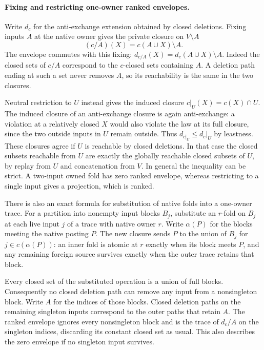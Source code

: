 \paragraph{Fixing and restricting one-owner ranked envelopes.}
Write $d_c$ for the anti-exchange extension obtained by
closed deletions. Fixing inputs $A$ at the native owner
gives the private closure on $V\setminus A$
\[
 (c/A)(X)=c(A\cup X)\setminus A .
\]
The envelope commutes with this fixing:
$d_{c/A}(X)=d_c(A\cup X)\setminus A$.
Indeed the closed sets of $c/A$ correspond to the
$c$-closed sets containing $A$. A deletion path ending
at such a set never removes $A$, so its reachability
is the same in the two closures.

Neutral restriction to $U$ instead gives the induced
closure $c|_U(X)=c(X)\cap U$. The induced closure of
an anti-exchange closure is again anti-exchange:
a violation at a relatively closed $X$ would also
violate the law at its full closure, since the two
outside inputs in $U$ remain outside. Thus
$d_{c|_U}\le d_c|_U$ by leastness. These closures agree
if $U$ is reachable by closed deletions. In that case
the closed subsets reachable from $U$ are exactly the
globally reachable closed subsets of $U$, by replay
from $U$ and concatenation from $V$. In general the
inequality can be strict. A two-input owned fold has
zero ranked envelope, whereas restricting to a single
input gives a projection, which is ranked.

There is also an exact formula for substitution of
native folds into a one-owner trace. For a partition
into nonempty input blocks $B_j$, substitute an
$r$-fold on $B_j$ at each live input $j$ of a trace
with native owner $r$. Write $\alpha(P)$ for the blocks
meeting the native posting $P$. The new closure sends
$P$ to the union of $B_j$ for $j\in c(\alpha(P))$:
an inner fold is atomic at $r$ exactly when its block
meets $P$, and any remaining foreign source survives
exactly when the outer trace retains that block.

Every closed set of the substituted operation is a union
of full blocks. Consequently no closed deletion path can
remove any input from a nonsingleton block. Write $A$ for
the indices of those blocks. Closed deletion paths on the
remaining singleton inputs correspond to the outer paths
that retain $A$. The ranked envelope ignores every
nonsingleton block and is the trace of $d_c/A$ on the
singleton indices, discarding its constant closed set
as usual. This also describes the zero envelope if no
singleton input survives.

